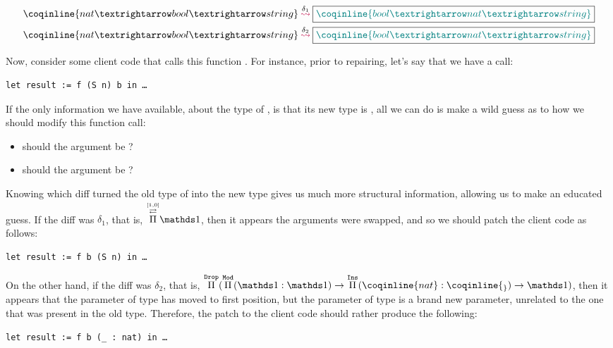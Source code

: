 \begin{align*}
\MathPatches
{\coqinline{nat → bool → string}}
{\delta_{1}}
{\coqinline{bool → nat → string}}\\
\MathPatches
{\coqinline{nat → bool → string}}
{\delta_{2}}
{\coqinline{bool → nat → string}}
\end{align*}

Now, consider some client code that calls this function .  For
instance, prior to repairing, let's say that we have a call:

\begin{verbatim}
let result := f (S n) b in …
\end{verbatim}

If the only information we have available, about the type of , is
that its new type is , all we can do is make a
wild guess as to how we should modify this function call:

\begin{itemize}
\item should the  argument be ?
\item should the  argument be ?
\end{itemize}

Knowing which diff turned the old type of  into the new type gives
us much more structural information, allowing us to make an educated guess.  If
the diff was $\delta_{1}$, that is, $\MathPermutePis{[1, 0]}{\MathSame{}}$, then
it appears the arguments were swapped, and so we should patch the client code as
follows:

\begin{verbatim}
let result := f b (S n) in …
\end{verbatim}

\noindent%
%
On the other hand, if the diff was $\delta_{2}$, that is,
$\MathDropPi{(\MathModPi{\MathSame{}}{\MathSame{}}
{\MathInsPi{\coqinline{_}}{\coqinline{nat}}{\MathSame{}}})}$, then it appears
that the parameter of type  has moved to first position, but the
parameter of type  is a brand new parameter, unrelated to the one
that was present in the old type.  Therefore, the patch to the client code
should rather produce the following:

\begin{verbatim}
let result := f b (_ : nat) in …
\end{verbatim}


